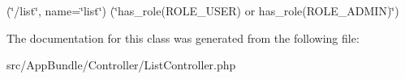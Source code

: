 (\char`\"{}/list\char`\"{}, name=\char`\"{}list\char`\"{}) (\char`\"{}has\+\_\+role(\textquotesingle{}\+R\+O\+L\+E\+\_\+\+U\+S\+E\+R\textquotesingle{}) or has\+\_\+role(\textquotesingle{}\+R\+O\+L\+E\+\_\+\+A\+D\+M\+I\+N\textquotesingle{})\char`\"{}) 

The documentation for this class was generated from the following file\+:\begin{DoxyCompactItemize}
\item 
src/\+App\+Bundle/\+Controller/List\+Controller.\+php\end{DoxyCompactItemize}
